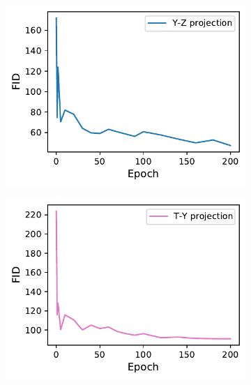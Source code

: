 \begin{figure}
    \centering
    \begin{subfigure}[t]{0.32\textwidth}
        \centering
        \hspace{-0.85cm}
        \includegraphics[width=\textwidth]{chapter4/fid_epoch-yz.pdf}
    \end{subfigure}
    \begin{subfigure}[t]{0.32\textwidth}
        \centering
        \hspace{-0.85cm}
        \includegraphics[width=\textwidth]{chapter4/fid_epoch-ty.pdf}
    \end{subfigure}
    \begin{subfigure}[t]{0.32\textwidth}

\end{subfigure}
\end{figure}
